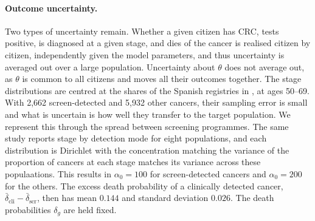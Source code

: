 \documentclass[12pt]{article}
\begin{document}
\paragraph{Outcome uncertainty.} Two types of uncertainty remain. Whether a given citizen has CRC, tests positive, is diagnosed at a given stage, and dies of the cancer is realised citizen by citizen, independently given the model parameters, and thus uncertainty is averaged out over a large population. Uncertainty about $\theta$ does not average out, as $\theta$ is common to all citizens and moves all their outcomes together. The stage distributions are centred at the shares of the Spanish registries in \citet{cardoso2022overall}, at ages 50--69. With 2{,}662 screen-detected and 5{,}932 other cancers, their sampling error is small and what is uncertain is how well they transfer to the target population. We represent this through the spread between screening programmes. The same study reports stage by detection mode for eight populations, and each distribution is Dirichlet with the concentration matching the variance of the proportion of cancers at each stage matches its variance across these populaations. This results in $\alpha_0 = 100$ for screen-detected cancers and $\alpha_0 = 200$ for the others. The excess death probability of a clinically detected cancer, $\bar\delta_{\text{cli}} - \bar\delta_{\text{scr}}$, then has mean $0.144$ and standard deviation $0.026$. The death probabilities $\delta_g$ are held fixed.
\end{document}

